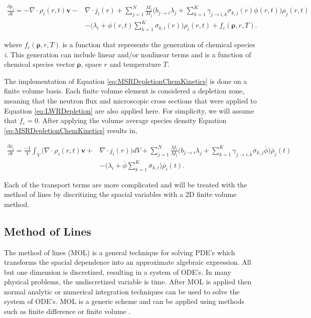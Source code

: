 \begin{equation}
\begin{split}
    \frac{\partial \rho_{i}}{\partial t}
    = -\nabla \cdot \rho_{i}(r,t)\boldsymbol{v}
    - &\nabla \cdot j_{i}(r)
    +
    \sum_{j=1}^{N}\frac{M_{i}}{M_{j}}\bigg(b_{j\rightarrow i}\lambda_{j} + 
    \sum_{k=1}^{K}\gamma_{j\rightarrow i,k}\sigma_{k,j}(r)\phi(r,t) \bigg)\rho_{j}(r,t)\\
    &- \bigg(\lambda_{i} + \phi(r,t)\sum_{k=1}^{K} \sigma_{k,i}(r)\bigg)\rho_{i}(r,t) +  f_{c}(\boldsymbol{\rho}, r, T).
\end{split}
    \label{eq:MSRDepletionChemKinetics}
\end{equation}

\noindent where $f_{c}(\boldsymbol{\rho}, r, T)$ is a function that represents the generation of chemical species \textit{i}. This generation can include linear and/or nonlinear terms and is a function of chemical species vector $\boldsymbol{\rho}$, space $r$ and temperature $T$. 

The implementation of Equation \ref{eq:MSRDepletionChemKinetics} is done on a finite volume basis. Each finite volume element is considered a depletion zone, meaning that the neutron flux and microscopic cross sections that were applied to Equation \ref{eq:LWRDepletion} are also applied here. For simplicity, we will assume that $f_{c} = 0$. After applying the volume average species density Equation \ref{eq:MSRDepletionChemKinetics} results in,

\begin{equation}
\begin{split}
    \frac{\partial \overline{\rho}_{i}}{\partial t}
    = \frac{-1}{V}\int_{V}\bigg(\nabla \cdot \rho_{i}(r,t)\boldsymbol{v}
    + &\nabla \cdot j_{i}(r)\bigg)dV
    +
    \sum_{j=1}^{N}\frac{M_{i}}{M_{j}}\bigg(b_{j\rightarrow i}\lambda_{j} + 
    \sum_{k=1}^{K}\gamma_{j\rightarrow i,k}\overline{\sigma}_{k,j}\overline{\phi} \bigg)\overline{\rho}_{j}(t)\\
    &- \bigg(\lambda_{i} + \overline{\phi}\sum_{k=1}^{K} \overline{\sigma}_{k,i}\bigg)\overline{\rho}_{i}(t).
\end{split}
\end{equation}

\noindent Each of the transport terms are more complicated and will be treated with the method of lines by discritizing the spacial variables with a 2D finite volume method.


\subsection{Method of Lines}
The method of lines (MOL) is a general technique for solving PDE's which transforms the spacial dependence into an approximate algebraic expression. All but one dimension is discretized, resulting in a system of ODE's. In many physical problems, the undiscretized variable is time. After MOL is applied then normal analytic or numerical integration techniques can be used to solve the system of ODE's. MOL is a generic scheme and can be applied using methods such as finite difference or finite volume \cite{hamdi2007}. 


